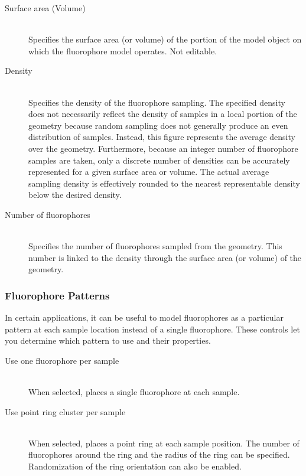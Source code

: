 \documentclass[11pt,titlepage,twoside]{article}
\begin{document}
\begin{description}

\item[Surface area (Volume)] \hfill \\
Specifies the surface area (or volume) of the portion of the model object on which the fluorophore model operates. Not editable.

\item[Density] \hfill \\
Specifies the density of the fluorophore sampling. The specified density does not necessarily reflect the density of samples in a local portion of the geometry because random sampling does not generally produce an even distribution of samples. Instead, this figure represents the average density over the geometry. Furthermore, because an integer number of fluorophore samples are taken, only a discrete number of densities can be accurately represented for a given surface area or volume. The actual average sampling density is effectively rounded to the nearest representable density below the desired density.

\item[Number of fluorophores] \hfill \\
Specifies the number of fluorophores sampled from the geometry. This number is linked to the density through the surface area (or volume) of the geometry.

\end{description}

\subsubsection{Fluorophore Patterns}

In certain applications, it can be useful to model fluorophores as a particular pattern at each sample location instead of a single fluorophore. These controls let you determine which pattern to use and their properties.

\begin{description}

\item[Use one fluorophore per sample] \hfill \\
When selected, places a single fluorophore at each sample.

\item[Use point ring cluster per sample] \hfill \\
When selected, places a point ring at each sample position. The number of fluorophores around the ring and the radius of the ring can be specified. Randomization of the ring orientation can also be enabled.

\end{description}
\end{document}
